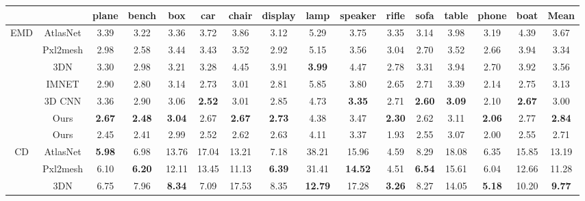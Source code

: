 \begin{table}[htb!]
\hspace*{-0.9cm}
\setlength{\tabcolsep}{1.5pt} \setlength{\arrayrulewidth}{1pt}
\begin{tabular}{c|c|ccccccccccccc|c}
                \Xhline{2\arrayrulewidth}
                     &            & plane & bench & box   & car   & chair & display & lamp  & speaker & rifle & sofa  & table & phone & boat  & Mean  \\ 
                     \hline
\multirow{7}{*}{EMD} & AtlasNet   & 3.39  & 3.22  & 3.36  & 3.72  & 3.86  & 3.12    & 5.29  & 3.75    & 3.35  & 3.14  & 3.98  & 3.19  & 4.39  & 3.67  \\
                     & Pxl2mesh & 2.98  & 2.58  & 3.44  & 3.43  & 3.52  & 2.92    & 5.15  & 3.56    & 3.04  & 2.70  & 3.52  & 2.66  & 3.94  & 3.34  \\
                     & 3DN        & 3.30  & 2.98  & 3.21  & 3.28  & 4.45  & 3.91    & \textbf{3.99}  & 4.47    & 2.78  & 3.31  & 3.94  & 2.70  & 3.92  & 3.56  \\
                     & IMNET     & 2.90  &    2.80  &    3.14  &    2.73  &    3.01  &    2.81    & 5.85  & 3.80    &    2.65  &    2.71  &    3.39  &    2.14    &  2.75  & 3.13       \\
                     & 3D CNN     & 3.36   & 2.90 & 3.06  & \textbf{2.52}   & 3.01  &  2.85  & 4.73   & \textbf{3.35}   &  2.71  &  \textbf{2.60}  & \textbf{3.09}  & 2.10  &  \textbf{2.67}  & 3.00 \\
                     & Ours& \textbf{2.67}    & \textbf{2.48} &    \textbf{3.04}    & 2.67 &    \textbf{2.67}    & \textbf{2.73} & 4.38 &    3.47 & \textbf{2.30} & 2.62 & 3.11 & \textbf{2.06} & 2.77 & \textbf{2.84}       \\
                     & Ours& 2.45    & 2.41 &    2.99    & 2.52 &    2.62    & 2.63 & 4.11 &    3.37 & 1.93 & 2.55 & 3.07 & 2.00    & 2.55 & 2.71     \\\hline
\multirow{7}{*}{CD}  & AtlasNet   & \textbf{5.98}  & 6.98  & 13.76 & 17.04 & 13.21 & 7.18    & 38.21 & 15.96   & 4.59  & 8.29  & 18.08 & 6.35  & 15.85 & 13.19 \\
                     & Pxl2mesh & 6.10  & \textbf{6.20}  & 12.11 & 13.45 & 11.13 & \textbf{6.39}    & 31.41 & \textbf{14.52}   & 4.51  & \textbf{6.54}  & 15.61 & 6.04  & 12.66 & 11.28 \\
                     & 3DN        & 6.75  & 7.96  & \textbf{8.34}  & 7.09  & 17.53 & 8.35    & \textbf{12.79} & 17.28   & \textbf{3.26}  & 8.27  & 14.05 & \textbf{5.18}  & 10.20 & \textbf{9.77}  \\

\end{tabular}
\end{table}
